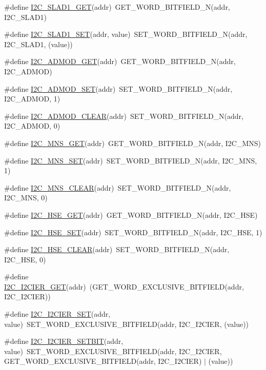 \begin{DoxyCompactItemize}
\item 
\#define \hyperlink{a00557_adee2f89ed4bbb8e708904ad67ef57ec1}{I2C\_\-SLAD1\_\-GET}(addr)~GET\_\-WORD\_\-BITFIELD\_\-N(addr, I2C\_\-SLAD1)
\item 
\#define \hyperlink{a00557_aefe155d4adfd1c93191432c808afe917}{I2C\_\-SLAD1\_\-SET}(addr, value)~SET\_\-WORD\_\-BITFIELD\_\-N(addr, I2C\_\-SLAD1, (value))
\item 
\#define \hyperlink{a00557_a4947c959c02bbb9a5068746a88597a29}{I2C\_\-ADMOD\_\-GET}(addr)~GET\_\-WORD\_\-BITFIELD\_\-N(addr, I2C\_\-ADMOD)
\item 
\#define \hyperlink{a00557_a89071ae1cac238f0603d983dc1c46e6e}{I2C\_\-ADMOD\_\-SET}(addr)~SET\_\-WORD\_\-BITFIELD\_\-N(addr, I2C\_\-ADMOD, 1)
\item 
\#define \hyperlink{a00557_a66f94d42b2fe4030db0b71f417b5d5ed}{I2C\_\-ADMOD\_\-CLEAR}(addr)~SET\_\-WORD\_\-BITFIELD\_\-N(addr, I2C\_\-ADMOD, 0)
\item 
\#define \hyperlink{a00557_a869678c81dae39a776dddce1806eeca7}{I2C\_\-MNS\_\-GET}(addr)~GET\_\-WORD\_\-BITFIELD\_\-N(addr, I2C\_\-MNS)
\item 
\#define \hyperlink{a00557_a0bf93b3893ecf1c5b32875ca767a7a2e}{I2C\_\-MNS\_\-SET}(addr)~SET\_\-WORD\_\-BITFIELD\_\-N(addr, I2C\_\-MNS, 1)
\item 
\#define \hyperlink{a00557_a3ede580f616b526a55ddf5a8dfdceb34}{I2C\_\-MNS\_\-CLEAR}(addr)~SET\_\-WORD\_\-BITFIELD\_\-N(addr, I2C\_\-MNS, 0)
\item 
\#define \hyperlink{a00557_a0ebc0775e5dd6a203bf81b1600914a83}{I2C\_\-HSE\_\-GET}(addr)~GET\_\-WORD\_\-BITFIELD\_\-N(addr, I2C\_\-HSE)
\item 
\#define \hyperlink{a00557_a4f25bdfeb3d78fbc92e493eeeed7bf67}{I2C\_\-HSE\_\-SET}(addr)~SET\_\-WORD\_\-BITFIELD\_\-N(addr, I2C\_\-HSE, 1)
\item 
\#define \hyperlink{a00557_a43c9660ebcfcf6076f31500eb5817f62}{I2C\_\-HSE\_\-CLEAR}(addr)~SET\_\-WORD\_\-BITFIELD\_\-N(addr, I2C\_\-HSE, 0)
\item 
\#define \hyperlink{a00557_a7c2bbd1a8eaa0a03dbf446580a8c5a1b}{I2C\_\-I2CIER\_\-GET}(addr)~(GET\_\-WORD\_\-EXCLUSIVE\_\-BITFIELD(addr, I2C\_\-I2CIER))
\item 
\#define \hyperlink{a00557_a66f9af47f156ad6e961b2fa0f7e4f928}{I2C\_\-I2CIER\_\-SET}(addr, value)~SET\_\-WORD\_\-EXCLUSIVE\_\-BITFIELD(addr, I2C\_\-I2CIER, (value))
\item 
\#define \hyperlink{a00557_a193eb86dd18ba6d1e92efa94bcea861b}{I2C\_\-I2CIER\_\-SETBIT}(addr, value)~SET\_\-WORD\_\-EXCLUSIVE\_\-BITFIELD(addr, I2C\_\-I2CIER, GET\_\-WORD\_\-EXCLUSIVE\_\-BITFIELD(addr, I2C\_\-I2CIER) $|$ (value))

\end{DoxyCompactItemize}
